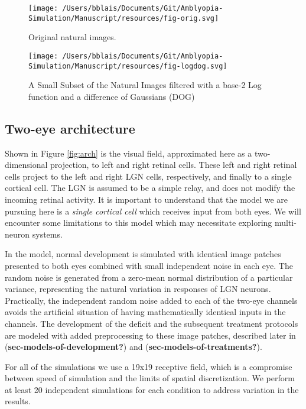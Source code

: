 \documentclass[
  onecolumn]{article}
\begin{document}
\begin{figure}
\hypertarget{fig:orig}{%
\centering
\texttt{[image: /Users/bblais/Documents/Git/Amblyopia-Simulation/Manuscript/resources/fig-orig.svg]}
\caption{Original natural images.}\label{fig:orig}
}
\end{figure}

\begin{figure}
\hypertarget{fig:logdog}{%
\centering
\texttt{[image: /Users/bblais/Documents/Git/Amblyopia-Simulation/Manuscript/resources/fig-logdog.svg]}
\caption{A Small Subset of the Natural Images filtered with a base-2 Log
function and a difference of Gaussians (DOG)}\label{fig:logdog}
}
\end{figure}

\hypertarget{two-eye-architecture}{%
\subsection{Two-eye architecture}\label{two-eye-architecture}}

Shown in Figure \ref{fig:arch} is the visual field, approximated here as
a two-dimensional projection, to left and right retinal cells. These
left and right retinal cells project to the left and right LGN cells,
respectively, and finally to a single cortical cell. The LGN is assumed
to be a simple relay, and does not modify the incoming retinal activity.
It is important to understand that the model we are pursuing here is a
\emph{single cortical cell} which receives input from both eyes. We will
encounter some limitations to this model which may necessitate exploring
multi-neuron systems.

In the model, normal development is simulated with identical image
patches presented to both eyes combined with small independent noise in
each eye. The random noise is generated from a zero-mean normal
distribution of a particular variance, representing the natural
variation in responses of LGN neurons. Practically, the independent
random noise added to each of the two-eye channels avoids the artificial
situation of having mathematically identical inputs in the channels. The
development of the deficit and the subsequent treatment protocols are
modeled with added preprocessing to these image patches, described later
in (\textbf{sec-models-of-development?}) and
(\textbf{sec-models-of-treatments?}).

For all of the simulations we use a 19x19 receptive field, which is a
compromise between speed of simulation and the limits of spatial
discretization. We perform at least 20 independent simulations for each
condition to address variation in the results.
\end{document}
